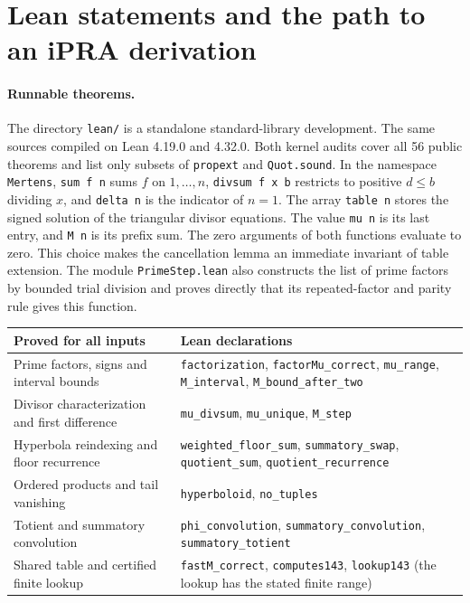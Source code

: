 \section{Lean statements and the path to an iPRA derivation}\label{sec:lean}

\paragraph{Runnable theorems.}
The directory \texttt{lean/} is a standalone standard-library development. The same sources compiled on Lean 4.19.0 and 4.32.0. Both kernel audits cover all 56 public theorems and list only subsets of \texttt{propext} and \texttt{Quot.sound}. In the namespace \texttt{Mertens}, \texttt{sum f n} sums $f$ on $1,\dots,n$, \texttt{divsum f x b} restricts to positive $d\le b$ dividing $x$, and \texttt{delta n} is the indicator of $n=1$. The array \texttt{table n} stores the signed solution of the triangular divisor equations. The value \texttt{mu n} is its last entry, and \texttt{M n} is its prefix sum. The zero arguments of both functions evaluate to zero. This choice makes the cancellation lemma an immediate invariant of table extension. The module \texttt{PrimeStep.lean} also constructs the list of prime factors by bounded trial division and proves directly that its repeated-factor and parity rule gives this function.

\begin{center}\small
\begin{tabularx}{\linewidth}{@{}p{.30\linewidth}X@{}}
\toprule
Proved for all inputs & Lean declarations\\ \midrule
Prime factors, signs and interval bounds & \texttt{factorization}, \texttt{factorMu\_correct}, \texttt{mu\_range}, \texttt{M\_interval}, \texttt{M\_bound\_after\_two}\\
Divisor characterization and first difference & \texttt{mu\_divsum}, \texttt{mu\_unique}, \texttt{M\_step}\\
Hyperbola reindexing and floor recurrence & \texttt{weighted\_floor\_sum}, \texttt{summatory\_swap}, \texttt{quotient\_sum}, \texttt{quotient\_recurrence}\\
Ordered products and tail vanishing & \texttt{hyperboloid}, \texttt{no\_tuples}\\
Totient and summatory convolution & \texttt{phi\_convolution}, \texttt{summatory\_convolution}, \texttt{summatory\_totient}\\
Shared table and certified finite lookup & \texttt{fastM\_correct}, \texttt{computes143}, \texttt{lookup143} (the lookup has the stated finite range)\\
\bottomrule
\end{tabularx}
\end{center}

